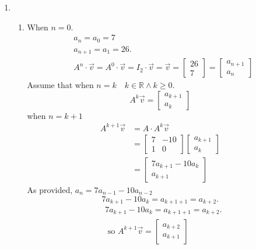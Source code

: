 \documentclass[11pt]{article}
\begin{document}
\begin{enumerate}[{\bf Q1.}]
		\newpage
		
		\item 
		\begin{enumerate}
			\item 
			When $n=0$.
			$$
			\begin{aligned}
			& a_n=a_0=7 \\
			& a_{n+1}=a_1=26 . \\
			& A^n \cdot \vec{v}=A^0 \cdot \vec{v}=I_2 \cdot \vec{v}=\vec{v}=\left[\begin{array}{l}
			26 \\
			7
			\end{array}\right]=\left[\begin{array}{l}
			a_{n+1} \\
			a_n
			\end{array}\right]
			\end{aligned}
			$$
			Assume that when $n=k \quad k \in \mathbb{R} \wedge k \geqslant 0$.
			$$
			A^k \vec{v}=\left[\begin{array}{l}
			a_{k+1} \\
			a_k
			\end{array}\right]
			$$
			when $n=k+1$
			$$
			\begin{aligned}
			A^{k+1} \vec{v} & =A \cdot A^k \vec{v} \\
			& =\left[\begin{array}{cc}
			7 & -10 \\
			1 & 0
			\end{array}\right]\left[\begin{array}{l}
			a_{k+1} \\
			a_k
			\end{array}\right] \\
			& =\left[\begin{array}{c}
			7 a_{k+1}-10 a_k \\
			a_{k+1}
			\end{array}\right]
			\end{aligned}
			$$
			As provided, $a_n=7 a_{n-1}-10 a_{n-2}$
			$$
			7 a_{k+1}-10 a_k=a_{k+1+1}=a_{k+2} .
			$$
			$$
			\begin{aligned}
			& 7 a_{k+1}-10 a_k=a_{k+1+1}=a_{k+2} . \\
			& \text { so } A^{k+1} \vec{v}=\left[\begin{array}{l}
			a_{k+2} \\
			a_{k+1}
			\end{array}\right]
			\end{aligned}
$$
\end{enumerate}
\end{enumerate}
\end{document}
